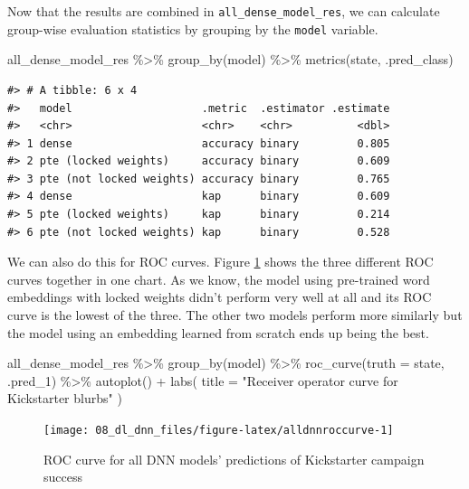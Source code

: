 \documentclass[
]{krantz}
\makeatletter
\newenvironment{Shaded}{\begin{snugshade}}{\end{snugshade}}
\newcommand{\AttributeTok}[1]{\textcolor[rgb]{0.77,0.63,0.00}{#1}}
\newcommand{\FunctionTok}[1]{\textcolor[rgb]{0.00,0.00,0.00}{#1}}
\newcommand{\NormalTok}[1]{#1}
\newcommand{\SpecialCharTok}[1]{\textcolor[rgb]{0.00,0.00,0.00}{#1}}
\newcommand{\StringTok}[1]{\textcolor[rgb]{0.31,0.60,0.02}{#1}}
\newenvironment{kframe}{%
\medskip{}
\setlength{\fboxsep}{.8em}
 \def\at@end@of@kframe{}%
 \ifinner\ifhmode%
  \def\at@end@of@kframe{\end{minipage}}%
  \begin{minipage}{\columnwidth}%
 \fi\fi%
 \def\FrameCommand##1{\hskip\@totalleftmargin \hskip-\fboxsep
 \colorbox{shadecolor}{##1}\hskip-\fboxsep
     \hskip-\linewidth \hskip-\@totalleftmargin \hskip\columnwidth}%
 \MakeFramed {\advance\hsize-\width
   \@totalleftmargin\z@ \linewidth\hsize
   \@setminipage}}%
 {\par\unskip\endMakeFramed%
 \at@end@of@kframe}
\renewenvironment{Shaded}{\begin{kframe}}{\end{kframe}}
\makeatother
\begin{document}
Now that the results are combined in \texttt{all\_dense\_model\_res}, we can calculate group-wise evaluation statistics by grouping by the \texttt{model} variable.

\begin{Shaded}
\begin{Highlighting}[]
\NormalTok{all\_dense\_model\_res }\SpecialCharTok{\%\textgreater{}\%}
  \FunctionTok{group\_by}\NormalTok{(model) }\SpecialCharTok{\%\textgreater{}\%}
  \FunctionTok{metrics}\NormalTok{(state, .pred\_class)}
\end{Highlighting}
\end{Shaded}

\begin{verbatim}
#> # A tibble: 6 x 4
#>   model                    .metric  .estimator .estimate
#>   <chr>                    <chr>    <chr>          <dbl>
#> 1 dense                    accuracy binary         0.805
#> 2 pte (locked weights)     accuracy binary         0.609
#> 3 pte (not locked weights) accuracy binary         0.765
#> 4 dense                    kap      binary         0.609
#> 5 pte (locked weights)     kap      binary         0.214
#> 6 pte (not locked weights) kap      binary         0.528
\end{verbatim}

We can also do this for ROC curves. Figure \ref{fig:alldnnroccurve} shows the three different ROC curves together in one chart. As we know, the model using pre-trained word embeddings with locked weights didn't perform very well at all and its ROC curve is the lowest of the three. The other two models perform more similarly but the model using an embedding learned from scratch ends up being the best.

\begin{Shaded}
\begin{Highlighting}[]
\NormalTok{all\_dense\_model\_res }\SpecialCharTok{\%\textgreater{}\%}
  \FunctionTok{group\_by}\NormalTok{(model) }\SpecialCharTok{\%\textgreater{}\%}
  \FunctionTok{roc\_curve}\NormalTok{(}\AttributeTok{truth =}\NormalTok{ state, .pred\_1) }\SpecialCharTok{\%\textgreater{}\%}
  \FunctionTok{autoplot}\NormalTok{() }\SpecialCharTok{+}
  \FunctionTok{labs}\NormalTok{(}
    \AttributeTok{title =} \StringTok{"Receiver operator curve for Kickstarter blurbs"}
\NormalTok{  )}
\end{Highlighting}
\end{Shaded}

\begin{figure}

{\centering \texttt{[image: 08\_dl\_dnn\_files/figure-latex/alldnnroccurve-1]} 

}

\caption{ROC curve for all DNN models' predictions of Kickstarter campaign success}\label{fig:alldnnroccurve}
\end{figure}
\end{document}

